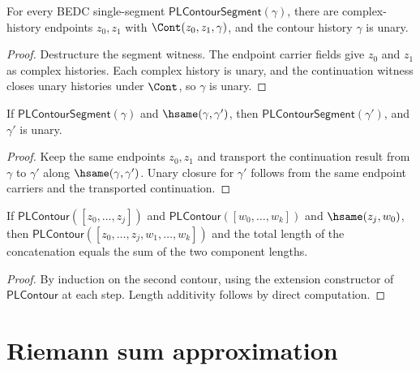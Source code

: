 \begin{lemma}
\label{lem:pl-contour-well-formed}
For every BEDC single-segment \(\mathsf{PLContourSegment}(\gamma)\), there are complex-history endpoints \(z_0,z_1\) with \(\Cont(z_0,z_1,\gamma)\), and the contour history \(\gamma\) is unary.
\end{lemma}
\begin{proof}
Destructure the segment witness. The endpoint carrier fields give \(z_0\) and \(z_1\) as complex histories. Each complex history is unary, and the continuation witness closes unary histories under \(\Cont\), so \(\gamma\) is unary.
\end{proof}

\begin{lemma}
\label{lem:pl-contour-segment-hsame-transport}
If \(\mathsf{PLContourSegment}(\gamma)\) and \(\hsame(\gamma,\gamma')\), then \(\mathsf{PLContourSegment}(\gamma')\), and \(\gamma'\) is unary.
\end{lemma}
\begin{proof}
Keep the same endpoints \(z_0,z_1\) and transport the continuation result from \(\gamma\) to \(\gamma'\) along \(\hsame(\gamma,\gamma')\). Unary closure for \(\gamma'\) follows from the same endpoint carriers and the transported continuation.
\end{proof}

\begin{lemma}
\label{lem:pl-contour-concat}
If \(\mathsf{PLContour}([z_0, \ldots, z_j])\) and \(\mathsf{PLContour}([w_0, \ldots, w_k])\) and \(\hsame(z_j, w_0)\), then \(\mathsf{PLContour}([z_0, \ldots, z_j, w_1, \ldots, w_k])\) and the total length of the concatenation equals the sum of the two component lengths.
\end{lemma}
\begin{proof}
By induction on the second contour, using the extension constructor of \(\mathsf{PLContour}\) at each step. Length additivity follows by direct computation.
\end{proof}

\section{Riemann sum approximation}

